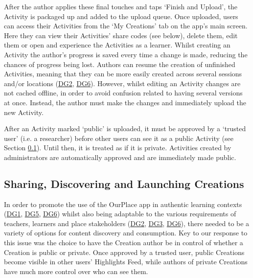 After the author applies these final touches and taps `Finish and Upload', the Activity is packaged up and added to the upload queue. Once uploaded, users can access their Activities from the ‘My Creations’ tab on the app's main screen. Here they can view their Activities' share codes (see below), delete them, edit them or open and experience the Activities as a learner. Whilst creating an Activity the author's progress is saved every time a change is made, reducing the chances of progress being lost. Authors can resume the creation of unfinished Activities, meaning that they can be more easily created across several sessions and/or locations (\hyperref[DG2]{DG2}, \hyperref[DG6]{DG6}). However, whilst editing an Activity changes are not cached offline, in order to avoid confusion related to having several versions at once. Instead, the author must make the changes and immediately upload the new Activity.

After an Activity marked `public' is uploaded, it must be approved by a `trusted user' (i.e. a researcher) before other users can see it as a public Activity (see Section \ref{sec:SharingActivities}). Until then, it is treated as if it is private. Activities created by administrators are automatically approved and are immediately made public.

\subsection{Sharing, Discovering and Launching Creations}
\label{sec:SharingActivities}

In order to promote the use of the OurPlace app in authentic learning contexts (\hyperref[DG1]{DG1}, \hyperref[DG5]{DG5}, \hyperref[DG6]{DG6}) whilst also being adaptable to the various requirements of teachers, learners and place stakeholders (\hyperref[DG2]{DG2}, \hyperref[DG3]{DG3}, \hyperref[DG6]{DG6}), there needed to be a variety of options for content discovery and consumption. Key to our response to this issue was the choice to have the Creation author be in control of whether a Creation is public or private. Once approved by a trusted user, public Creations become visible in other users' Highlights Feed, while authors of private Creations have much more control over who can see them. 

